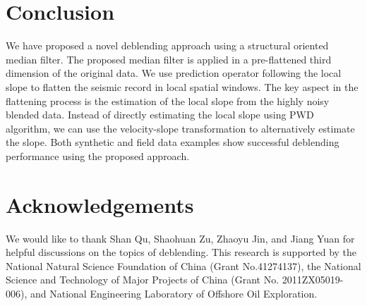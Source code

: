 \section{Conclusion}
We have proposed a novel deblending approach using a structural oriented median filter. The proposed median filter is applied in a pre-flattened third dimension of the original data. We use prediction operator following the local slope to flatten the seismic record in local spatial windows. The key aspect in the flattening process is the estimation of the local slope from the highly noisy blended data. Instead of directly estimating the local slope using PWD algorithm, we can use the velocity-slope transformation to alternatively estimate the slope.  Both synthetic and field data examples show successful deblending performance using the proposed approach.

\section{Acknowledgements}
We would like to thank Shan Qu, Shaohuan Zu, Zhaoyu Jin, and Jiang Yuan for helpful discussions on the topics of deblending.   This research is supported by the National Natural Science Foundation of China (Grant No.41274137), the National Science and Technology of Major Projects of China (Grant No. 2011ZX05019-006), and National Engineering Laboratory of Offshore Oil Exploration.





